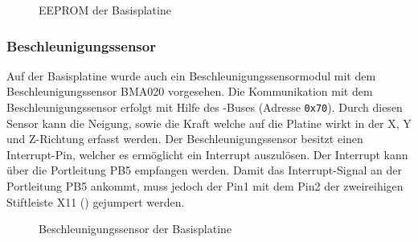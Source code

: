 \begin{figure}[H]
    \centering
    \qquad
    \qquad
    \caption[EEPROM der Basisplatine]{EEPROM der \gls{Basisplatine}}
    \label{fig:basisplatine-eeprom}
\end{figure}

\subsubsection{Beschleunigungssensor}
Auf der \gls{Basisplatine} wurde auch ein Beschleunigungssensormodul mit dem Beschleunigungssensor BMA020 vorgesehen. Die Kommunikation mit dem Beschleunigungssensor erfolgt mit Hilfe des \IIC{}-Buses (Adresse \texttt{0x70}). Durch diesen Sensor kann die Neigung, sowie die Kraft welche auf die Platine wirkt in der X, Y und Z-Richtung erfasst werden. Der Beschleunigungssensor besitzt einen Interrupt-Pin, welcher es ermöglicht ein Interrupt auszulösen. Der Interrupt kann über die Portleitung PB5 empfangen werden. Damit das Interrupt-Signal an der Portleitung PB5 ankommt, muss jedoch der Pin1 mit dem Pin2 der zweireihigen Stiftleiste X11 () gejumpert werden.

\begin{figure}[H]
    \centering
    \qquad
    \qquad
    \caption[Beschleunigungssensor der Basisplatine]{Beschleunigungssensor der \gls{Basisplatine}}
    \label{fig:basisplatine-bma}
\end{figure}

